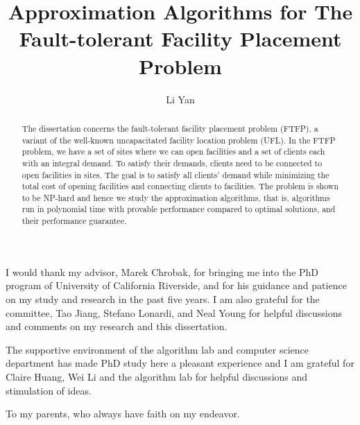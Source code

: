 \documentclass[oneside,final]{ucr}
\begin{document}

\title{Approximation Algorithms for The Fault-tolerant Facility Placement Problem}
\author{Li Yan}

\maketitle
\copyrightpage{}
\approvalpage{}


\begin{frontmatter}

\begin{acknowledgements}
  I would thank my advisor, Marek Chrobak, for bringing me into the
  PhD program of University of California Riverside, and for his
  guidance and patience on my study and research in the past five
  years. I am also grateful for the committee, Tao Jiang, Stefano
  Lonardi, and Neal Young for helpful discussions and comments on my
  research and this dissertation.

  The supportive environment of the algorithm lab and computer science
  department has made PhD study here a pleasant experience and I am
  grateful for Claire Huang, Wei Li and the algorithm lab for helpful
  discussions and stimulation of ideas.
\end{acknowledgements}

\begin{dedication}
\null\vfil
{\large
\begin{center}
  To my parents, who always have faith on my endeavor.
\end{center}}
\vfil\null
\end{dedication}

\begin{abstract}
  The dissertation concerns the fault-tolerant facility placement
  problem (FTFP), a variant of the well-known uncapacitated facility
  location problem (UFL). In the FTFP problem, we have a set of sites
  where we can open facilities and a set of clients each with an
  integral demand. To satisfy their demands, clients need to be
  connected to open facilities in sites. The goal is to satisfy all
  clients' demand while minimizing the total cost of opening
  facilities and connecting clients to facilities. The problem is
  shown to be NP-hard and hence we study the approximation algorithms,
  that is, algorithms run in polynomial time with provable performance
  compared to optimal solutions, and their performance guarantee.


\end{abstract}
\end{frontmatter}
\end{document}
